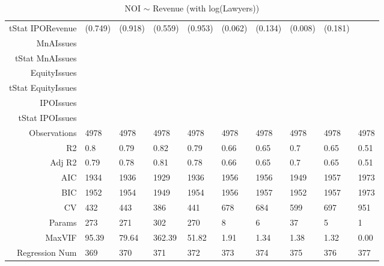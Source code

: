 \begin{table}[ht]
\begin{tabular}{rlllllllll}
  tStat IPORevenue & (0.749) & (0.918) & (0.559) & (0.953) & (0.062) & (0.134) & (0.008) & (0.181) &  \\ 
  MnAIssues &  &  &  &  &  &  &  &  &  \\ 
  tStat MnAIssues &  &  &  &  &  &  &  &  &  \\ 
  EquityIssues &  &  &  &  &  &  &  &  &  \\ 
  tStat EquityIssues &  &  &  &  &  &  &  &  &  \\ 
  IPOIssues &  &  &  &  &  &  &  &  &  \\ 
  tStat IPOIssues &  &  &  &  &  &  &  &  &  \\ 
  Observations & 4978 & 4978 & 4978 & 4978 & 4978 & 4978 & 4978 & 4978 & 4978 \\ 
  R2 & 0.8 & 0.79 & 0.82 & 0.79 & 0.66 & 0.65 & 0.7 & 0.65 & 0.51 \\ 
  Adj R2 & 0.79 & 0.78 & 0.81 & 0.78 & 0.66 & 0.65 & 0.7 & 0.65 & 0.51 \\ 
  AIC & 1934 & 1936 & 1929 & 1936 & 1956 & 1956 & 1949 & 1957 & 1973 \\ 
  BIC & 1952 & 1954 & 1949 & 1954 & 1956 & 1957 & 1952 & 1957 & 1973 \\ 
  CV & 432 & 443 & 386 & 441 & 678 & 684 & 599 & 697 & 951 \\ 
  Params & 273 & 271 & 302 & 270 & 8 & 6 & 37 & 5 & 1 \\ 
  MaxVIF & 95.39 & 79.64 & 362.39 & 51.82 & 1.91 & 1.34 & 1.38 & 1.32 & 0.00 \\ 
  Regression Num & 369 & 370 & 371 & 372 & 373 & 374 & 375 & 376 & 377 \\ 
   \hline
\end{tabular}
\caption{NOI $\sim$ Revenue (with log(Lawyers))} 
\end{table}
